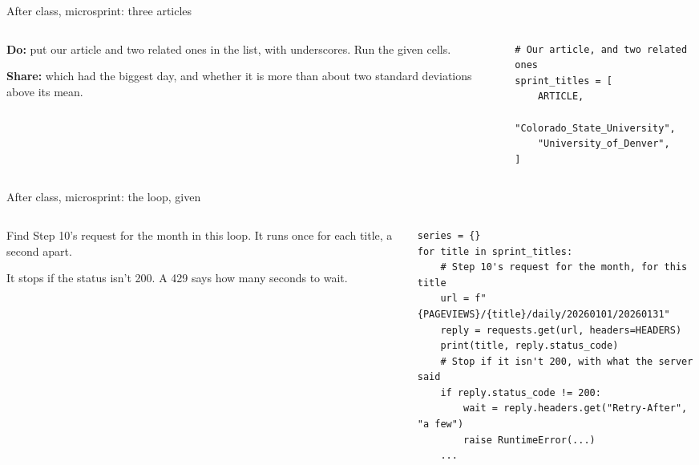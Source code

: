 \documentclass[9pt,aspectratio=169]{beamer}
\begin{document}
\begin{frame}[fragile]{After class, microsprint: three articles}
    \begin{columns}[T]
        \begin{column}{0.37\textwidth}
            \textbf{Do:} put our article and two related ones in the list, with underscores. Run the given cells.

            \medskip
            \textbf{Share:} which had the biggest day, and whether it is more than about two standard deviations above its mean.
        \end{column}
        \begin{column}{0.6\textwidth}
\begin{lstlisting}[style=lab]
# Our article, and two related ones
sprint_titles = [
    ARTICLE,
    "Colorado_State_University",
    "University_of_Denver",
]
\end{lstlisting}
        \end{column}
    \end{columns}
\end{frame}

\begin{frame}[fragile]{After class, microsprint: the loop, given}
    \begin{columns}[T]
        \begin{column}{0.37\textwidth}
            Find Step 10's request for the month in this loop. It runs once for each title, a second apart.

            \medskip
            It stops if the status isn't 200. A 429 says how many seconds to wait.
        \end{column}
        \begin{column}{0.6\textwidth}
\begin{lstlisting}[style=lab]
series = {}
for title in sprint_titles:
    # Step 10's request for the month, for this title
    url = f"{PAGEVIEWS}/{title}/daily/20260101/20260131"
    reply = requests.get(url, headers=HEADERS)
    print(title, reply.status_code)
    # Stop if it isn't 200, with what the server said
    if reply.status_code != 200:
        wait = reply.headers.get("Retry-After", "a few")
        raise RuntimeError(...)
    ...
\end{lstlisting}
        \end{column}
    \end{columns}
\end{frame}
\end{document}
